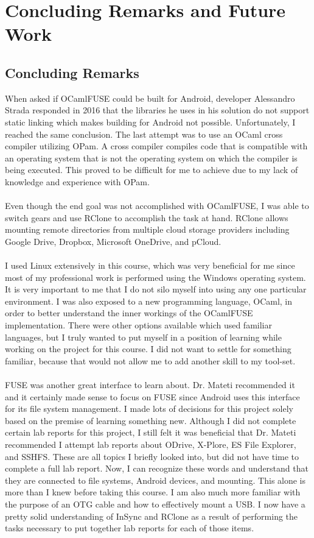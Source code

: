 \chapter{Concluding Remarks and Future Work}
\section{Concluding Remarks}
When asked if OCamlFUSE could be built for Android, developer Alessandro Strada responded in 2016 that the libraries he uses in his solution do not support static linking which makes building for Android not possible.\cite{ocamlfuseissue} Unfortunately, I reached the same conclusion. The last attempt was to use an OCaml cross compiler utilizing OPam.\cite{crosscompiler} A cross compiler compiles code that is compatible with an operating system that is not the operating system on which the compiler is being executed. This proved to be difficult for me to achieve due to my lack of knowledge and experience with OPam. \\\\
Even though the end goal was not accomplished with OCamlFUSE, I was able to switch gears and use RClone to accomplish the task at hand. RClone allows mounting remote directories from multiple cloud storage providers including Google Drive, Dropbox, Microsoft OneDrive, and pCloud.\\\\
I used Linux extensively in this course, which was very beneficial for me since most of my professional work is performed using the Windows operating system. It is very important to me that I do not silo myself into using any one particular environment. I was also exposed to a new programming language, OCaml, in order to better understand the inner workings of the OCamlFUSE implementation. There were other options available which used familiar languages, but I truly wanted to put myself in a position of learning while working on the project for this course. I did not want to settle for something familiar, because that would not allow me to add another skill to my tool-set. \\\\
FUSE was another great interface to learn about. Dr. Mateti recommended it and it certainly made sense to focus on FUSE since Android uses this interface for its file system management. I made lots of decisions for this project solely based on the premise of learning something new. Although I did not complete certain lab reports for this project, I still felt it was beneficial that Dr. Mateti recommended I attempt lab reports about ODrive, X-Plore, ES File Explorer, and SSHFS. These are all topics I briefly looked into, but did not have time to complete a full lab report. Now, I can recognize these words and understand that they are connected to file systems, Android devices, and mounting. This alone is more than I knew before taking this course. I am also much more familiar with the purpose of an OTG cable and how to effectively mount a USB. I now have a pretty solid understanding of InSync and RClone as a result of performing the tasks necessary to put together lab reports for each of those items.
